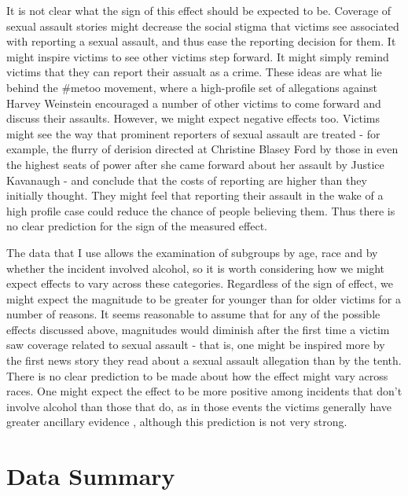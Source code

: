 \documentclass[AER,draftmode]{AEA}
\begin{document}
It is not clear what the sign of this effect should be expected to be. Coverage of sexual assault stories might decrease the social stigma that victims see associated with reporting a sexual assault, and thus ease the reporting decision for them. It might inspire victims to see other victims step forward. It might simply remind victims that they can report their assualt as a crime. These ideas are what lie behind the \#metoo movement, where a high-profile set of allegations against Harvey Weinstein encouraged a number of other victims to come forward and discuss their assaults. However, we might expect negative effects too. Victims might see the way that prominent reporters of sexual assault are treated - for example, the flurry of derision directed at Christine Blasey Ford by those in even the highest seats of power after she came forward about her assault by Justice Kavanaugh - and conclude that the costs of reporting are higher than they initially thought. They might feel that reporting their assault in the wake of a high profile case could reduce the chance of people believing them. Thus there is no clear prediction for the sign of the measured effect.

The data that I use allows the examination of subgroups by age, race and by whether the incident involved alcohol, so it is worth considering how we might expect effects to vary across these categories. Regardless of the sign of effect, we might expect the magnitude to be greater for younger than for older victims for a number of reasons. It seems reasonable to assume that for any of the possible effects discussed above, magnitudes would diminish after the first time a victim saw coverage related to sexual assault - that is, one might be inspired more by the first news story they read about a sexual assault allegation than by the tenth. There is no clear prediction to be made about how the effect might vary across races. One might expect the effect to be more positive among incidents that don't involve alcohol than those that do, as in those events the victims generally have greater ancillary evidence \cite{allen_reporting_2007}, although this prediction is not very strong.

\section{Data Summary}
\end{document}
